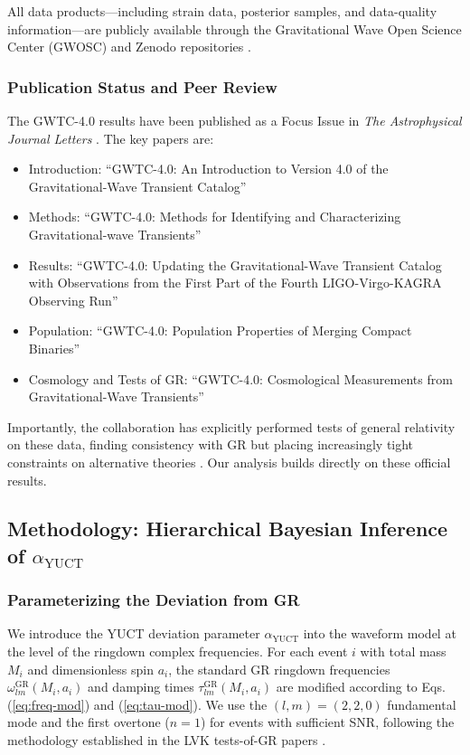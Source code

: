 \documentclass[12pt,a4paper]{article}
\theoremstyle{remark}
\begin{document}
	All data products—including strain data, posterior samples, and data-quality information—are publicly available through the Gravitational Wave Open Science Center (GWOSC) and Zenodo repositories .
	
	\subsubsection{Publication Status and Peer Review}
	
	The GWTC-4.0 results have been published as a Focus Issue in \textit{The Astrophysical Journal Letters} . The key papers are:
	
	\begin{itemize}
		\item Introduction: ``GWTC-4.0: An Introduction to Version 4.0 of the Gravitational-Wave Transient Catalog'' 
		\item Methods: ``GWTC-4.0: Methods for Identifying and Characterizing Gravitational-wave Transients'' 
		\item Results: ``GWTC-4.0: Updating the Gravitational-Wave Transient Catalog with Observations from the First Part of the Fourth LIGO-Virgo-KAGRA Observing Run'' 
		\item Population: ``GWTC-4.0: Population Properties of Merging Compact Binaries'' 
		\item Cosmology and Tests of GR: ``GWTC-4.0: Cosmological Measurements from Gravitational-Wave Transients'' 
	\end{itemize}
	
	Importantly, the collaboration has explicitly performed tests of general relativity on these data, finding consistency with GR but placing increasingly tight constraints on alternative theories . Our analysis builds directly on these official results.
	
	\subsection{Methodology: Hierarchical Bayesian Inference of $\alpha_{\text{YUCT}}$}
	
	\subsubsection{Parameterizing the Deviation from GR}
	
	We introduce the YUCT deviation parameter $\alpha_{\text{YUCT}}$ into the waveform model at the level of the ringdown complex frequencies. For each event $i$ with total mass $M_i$ and dimensionless spin $a_i$, the standard GR ringdown frequencies $\omega_{lm}^{\text{GR}}(M_i, a_i)$ and damping times $\tau_{lm}^{\text{GR}}(M_i, a_i)$ are modified according to Eqs. (\ref{eq:freq-mod}) and (\ref{eq:tau-mod}). We use the $(l,m) = (2,2,0)$ fundamental mode and the first overtone ($n=1$) for events with sufficient SNR, following the methodology established in the LVK tests-of-GR papers .
	
\end{document}
